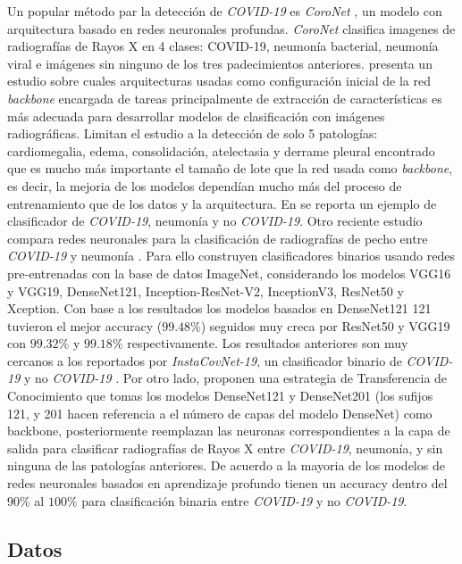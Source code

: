 Un popular método par la detección de \textit{COVID-19} es \textit{CoroNet} \cite{wang2020covid}, un
modelo con arquitectura basado en redes neuronales profundas. \textit{CoroNet} clasifica imagenes de
radiografías de Rayos X en 4 clases: COVID-19, neumonía bacterial, neumonía viral e imágenes sin
ninguno de los tres padecimientos anteriores. \citeauthor{bressem2020comparing} presenta un estudio
sobre cuales arquitecturas usadas como configuración inicial de la red \textit{backbone} encargada
de tareas principalmente de extracción de características es más adecuada para desarrollar modelos
de clasificación con imágenes radiográficas. Limitan el estudio a la detección de solo 5 patologías:
cardiomegalia, edema, consolidación, atelectasia y derrame pleural encontrado que es mucho más
importante el tamaño de lote que la red usada como \textit{backbone}, es decir, la mejoria de los
modelos dependían mucho más del proceso de entrenamiento que de los datos y la arquitectura.
En \cite{zhong2021deep} se reporta un ejemplo de clasificador de \textit{COVID-19}, neumonía y
no \textit{COVID-19}. Otro reciente estudio compara redes neuronales para la clasificación de
radiografías de pecho entre \textit{COVID-19} y neumonía \cite{shazia2021comparative}. Para ello
construyen clasificadores binarios usando redes pre-entrenadas con la base de datos ImageNet,
considerando los modelos VGG16 y VGG19, DenseNet121, Inception-ResNet-V2, InceptionV3, ResNet50 y
Xception. Con base a los resultados los modelos basados en DenseNet121 121 tuvieron el mejor
accuracy ($99.48\%$) seguidos muy creca por ResNet50 y VGG19 con $99.32\%$ y $99.18\%$
respectivamente. Los resultados anteriores son muy cercanos a los reportados por
\textit{InstaCovNet-19}, un clasificador binario de \textit{COVID-19} y no \textit{COVID-19}
\cite{gupta2021instacovnet}. Por otro lado, \citeauthor{bassi2021deep} proponen una estrategia de
Transferencia de Conocimiento que tomas los modelos DenseNet121 y DenseNet201 (los sufijos 121, y 201
hacen referencia a el número de capas del modelo DenseNet) como backbone, posteriormente reemplazan
las neuronas correspondientes a la capa de salida para clasificar radiografías de Rayos X entre
\textit{COVID-19}, neumonía, y sin ninguna de las patologías anteriores. De acuerdo a
\citeauthor{shoeibi2020automated} la mayoria de los modelos de redes neuronales basados en aprendizaje
profundo tienen un accuracy dentro del $90\%$ al $100\%$ para clasificación binaria entre
\textit{COVID-19} y no \textit{COVID-19}.


\subsection{Datos}

